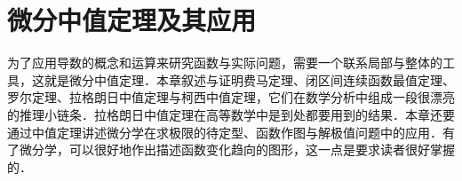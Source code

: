 \chapter{微分中值定理及其应用}\label{chap:05}

为了应用导数的概念和运算来研究函数与实际问题，需要一个联系局部与整体的工具，这就是微分中值定理．本章叙述与证明费马定理、闭区间连续函数最值定理、罗尔定理、拉格朗日中值定理与柯西中值定理，它们在数学分析中组成一段很漂亮的推理小链条．拉格朗日中值定理在高等数学中是到处都要用到的结果．本章还要通过中值定理讲述微分学在求极限的待定型、函数作图与解极值问题中的应用．有了微分学，可以很好地作出描述函数变化趋向的图形，这一点是要求读者很好掌握的．





